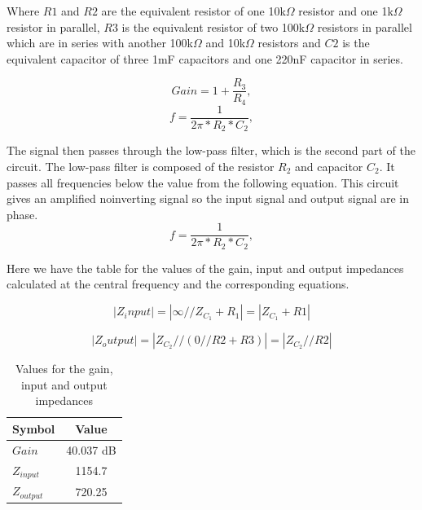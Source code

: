 Where $R1$ and $R2$ are the equivalent resistor of one 10k$\Omega$ resistor and one 1k$\Omega$ resistor in parallel, $R3$ is the equivalent resistor of two 100k$\Omega$ resistors in parallel which are in series with another 100k$\Omega$ and 10k$\Omega$ resistors and $C2$ is the equivalent capacitor of three 1mF capacitors and one 220nF capacitor in series.

\begin{equation}
  Gain = 1+ \frac{R_3}{R_4},
  \label{eq:gain}
\end{equation}
\begin{equation}
  {f} = \frac{1}{2\pi*R_2*C_2},
  \label{eq:f1}
\end{equation}

The signal then passes through the low-pass filter, which is the second part of the circuit. The low-pass filter is composed of the resistor $R_2$ and capacitor $C_2$. It passes all frequencies below the value from the following equation. This circuit gives an amplified noinverting signal so the input signal and output signal are in phase.
\begin{equation}
  {f} = \frac{1}{2\pi*R_2*C_2},
  \label{eq:f2}
\end{equation}



Here we have the table for the values of the gain, input and output impedances calculated at the central frequency and the corresponding equations. 


\begin{equation}
|Z_input| = |\infty // Z_{C_1} + R_1| = |Z_{C_1} + R1|
\label{eq:impendances1}
\end{equation}

\begin{equation}
|Z_output| = |Z_{C_2} // (0 // R2 + R3)| = |Z_{C_2} // R2|
\label{eq:impendances2}
\end{equation}

\begin{table}[h]
    \centering
    \begin{tabular}{|l|c|}
    \hline
    {\bf Symbol} & {\bf Value} \\ \hline
    $Gain$ & 40.037 dB\\ \hline
    $Z_{input}$ & 1154.7\\ \hline
    $Z_{output}$ &   720.25\\ \hline

    \end{tabular}
    \caption{Values for the gain, input and output impedances}
    \label{tab:valuesimp}
\end{table}

